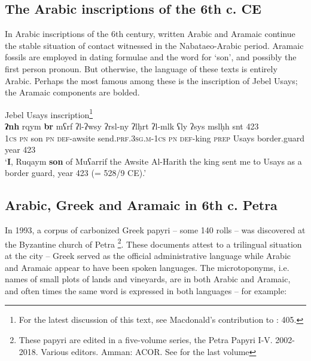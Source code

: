 \documentclass[output=paper]{langsci/langscibook}
\begin{document}
\subsection{The Arabic inscriptions of the 6th c. CE}
In Arabic inscriptions of the 6th century, written Arabic and Aramaic continue the stable situation of contact witnessed in the Nabataeo-Arabic period. Aramaic fossils are employed in dating formulae and the word for ‘son’, and possibly the first person pronoun. But otherwise, the language of these texts is entirely Arabic. Perhaps the most famous among these is the inscription of Jebel Usays; the Aramaic components are bolded.

\ea Jebel Usays inscription\footnote{For the latest discussion of this text, see Macdonald’s contribution to \citep{fiemaetal2015}: 405.}\\
\gll   \textbf{ʔnh}\footnotemark{} rqym \textbf{br} mʕrf ʔl-ʔwsy ʔrsl-ny ʔlḥrt ʔl-mlk ʕly ʔsys mslḥh snt 423 \\
       \textsc{1cs} \textsc{pn} son \textsc{pn} \textsc{def}-awsite send.\textsc{prf.3sg.m-1cs} \textsc{pn} \textsc{def}-king \textsc{prep} Usays border.guard year 423  \\
\glt   `\textbf{I}, Ruqaym \textbf{son} of Muʕarrif the Awsite Al-Harith the king sent me to Usays as a border guard, year 423 (= 528/9 CE).'\\
\z{}

\subsection{Arabic, Greek and Aramaic in 6th c. Petra}
In 1993, a corpus of carbonized Greek papyri – some 140 rolls – was discovered at the Byzantine church of Petra \footnote{These papyri are edited in a five-volume series, the Petra Papyri I-V. 2002-2018. Various editors. Amman: ACOR. See \citep{Arjavaetal2018} for the last volume}. These documents attest to a trilingual situation at the city – Greek served as the official administrative language while Arabic and Aramaic appear to have been spoken languages. The microtoponyms, i.e. names of small plots of lands and vineyards, are in both Arabic and Aramaic, and often times the same word is expressed in both languages – for example: 
\end{document}
